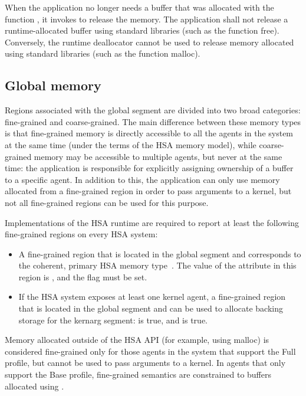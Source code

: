 \documentclass[oneside]{book}
\begin{document}
When the application no longer needs a buffer that was allocated with the
function , it invokes  to
release the memory. The application shall not release a runtime-allocated buffer
using standard libraries (such as the function free). Conversely, the runtime
deallocator cannot be used to release memory allocated using standard libraries
(such as the function malloc).

\subsection{Global memory}\label{sec:memory:global}

Regions associated with the global segment are divided into two broad
categories: fine-grained and coarse-grained. The main difference between these
memory types is that fine-grained memory is directly accessible to all the
agents in the system at the same time (under the terms of the HSA memory model),
while coarse-grained memory may be accessible to multiple agents, but never at
the same time: the application is responsible for explicitly assigning ownership
of a buffer to a specific agent. In addition to this, the application can only
use memory allocated from a fine-grained region in order to pass arguments to a
kernel, but not all fine-grained regions can be used for this purpose.

Implementations of the HSA runtime are required to report at least the following
fine-grained regions on every HSA system:
\begin{itemize}[itemsep=1pt,topsep=3pt,partopsep=0pt]
\item A fine-grained region that is located in the global segment and
  corresponds to the coherent, primary HSA memory type~\cite{sar}. The value of
  the attribute  in this region is
  , and the
   flag must be set.
\item If the HSA system exposes at least one kernel agent, a fine-grained
  region that is located in the global segment and can be used to allocate
  backing storage for the kernarg segment:
   is true, and
   is true.
\end{itemize}

Memory allocated outside of the HSA API (for example, using malloc) is
considered fine-grained only for those agents in the system that support the
Full profile, but cannot be used to pass arguments to a kernel. In agents
that only support the Base profile, fine-grained semantics are constrained to
buffers allocated using .
\end{document}
